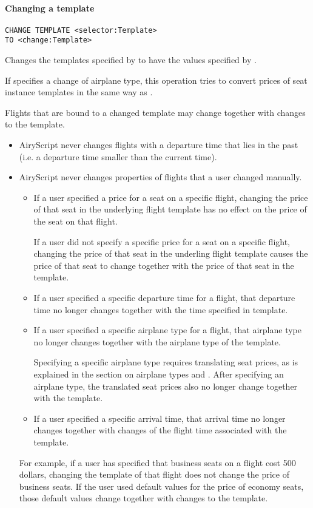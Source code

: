 \paragraph{Changing a template}
\begin{operation}
  \label{op:change_template}
  \begin{lstlisting}
CHANGE TEMPLATE <selector:Template>
TO <change:Template>
  \end{lstlisting}
\end{operation}
Changes the templates specified by  to have the values specified
by .

If  specifies a change of airplane type, this operation tries to
convert prices of seat instance templates in the same way as
.

Flights that are bound to a changed template may change together with changes to
the template.
\begin{itemize}
  \item AiryScript never changes flights with a departure time that lies in the
    past (i.e. a departure time smaller than the current time).
  \item AiryScript never changes properties of flights that a user changed
    manually.
    \begin{itemize}
      \item If a user specified a price for a seat on a specific flight,
        changing the price of that seat in the underlying flight template has no
        effect on the price of the seat on that flight.

        If a user did not specify a specific price for a seat on a specific
        flight, changing the price of that seat in the underling flight template
        causes the price of that seat to change together with the price of that
        seat in the template.
      \item If a user specified a specific departure time for a flight, that
        departure time no longer changes together with the time specified in
        template.
      \item If a user specified a specific airplane type for a flight, that
        airplane type no longer changes together with the airplane
        type of the template.

        Specifying a specific airplane type requires translating seat prices, as
        is explained in the section on airplane types and .
        After specifying an airplane type, the translated seat prices also no
        longer change together with the template.
      \item If a user specified a specific arrival time, that arrival time no
        longer changes together with changes of the flight time associated with
        the template.
    \end{itemize}
    
    For example, if a user has specified that business seats on a
    flight cost 500 dollars, changing the template of that flight does not
    change the price of business seats. If the user used default values for the
    price of economy seats, those default values change together with changes to
    the template.
\end{itemize}

